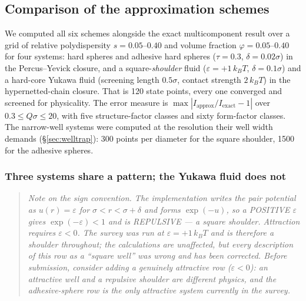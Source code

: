 %
%

\subsection{Comparison of the approximation schemes}
\label{sec:schemes}

We computed all six schemes alongside the exact multicomponent result over a
grid of relative polydispersity $s = 0.05$--$0.40$ and volume fraction
$\varphi = 0.05$--$0.40$ for four systems: hard spheres and adhesive hard
spheres ($\tau = 0.3$, $\delta = 0.02\sigma$) in the Percus--Yevick closure,
and a square-\emph{shoulder} fluid ($\varepsilon = +1\,k_BT$,
$\delta = 0.1\sigma$) and a
hard-core Yukawa fluid (screening length $0.5\sigma$, contact strength
$2\,k_BT$) in the hypernetted-chain closure. That is 120 state points, every
one converged and screened for physicality. The error measure is
$\max|I_{\mathrm{approx}}/I_{\mathrm{exact}} - 1|$ over
$0.3 \le Q\sigma \le 20$, with five structure-factor classes and sixty
form-factor classes. The narrow-well systems were computed at the resolution
their well width demands (\S\ref{sec:welltrap}): 300 points per diameter for
the square shoulder, 1500 for the adhesive spheres.

\subsubsection{Three systems share a pattern; the Yukawa fluid does not}

\begin{quote}\small\itshape
Note on the sign convention. The implementation writes the pair potential as
$u(r) = \varepsilon$ for $\sigma < r < \sigma+\delta$ and forms
$\exp(-u)$, so a POSITIVE $\varepsilon$ gives $\exp(-\varepsilon) < 1$ and is
REPULSIVE --- a square shoulder. Attraction requires $\varepsilon < 0$. The
survey was run at $\varepsilon = +1\,k_BT$ and is therefore a shoulder
throughout; the calculations are unaffected, but every description of this
row as a ``square well'' was wrong and has been corrected. Before submission,
consider adding a genuinely attractive row ($\varepsilon < 0$): an attractive
well and a repulsive shoulder are different physics, and the adhesive-sphere
row is the only attractive system currently in the survey.
\end{quote}

